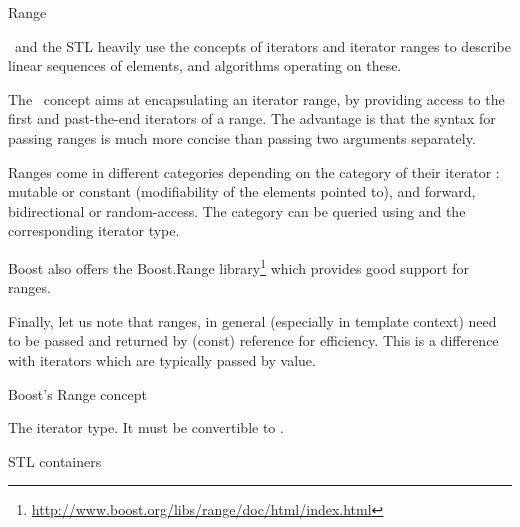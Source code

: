 \begin{ccRefConcept}{Range}

\ccDefinition

\cgal\ and the STL heavily use the concepts of iterators and iterator ranges
to describe linear sequences of elements, and algorithms operating on these.

The \ccRefName\ concept aims at encapsulating an iterator range, by providing
access to the first and past-the-end iterators of a range.  The advantage is
that the syntax for passing ranges is much more concise than passing two
arguments separately.


Ranges come in different categories depending on the category of their iterator :
mutable or constant (modifiability of the elements pointed to), and forward,
bidirectional or random-access.  The category can be queried using
 and the corresponding iterator type.

Boost also offers the Boost.Range
library\footnote{\url{http://www.boost.org/libs/range/doc/html/index.html}}
which provides good support for ranges.

Finally, let us note that ranges, in general (especially in template context)
need to be passed and returned by (const) reference for efficiency.  This is a
difference with iterators which are typically passed by value.

\ccRefines


Boost's Range concept

{}  %

\ccTypes

 {The iterator type.  It must be convertible to .}


\def\ccTagRmTrailingConst{\ccFalse}

\ccGlue
{}

\def\ccTagRmTrailingConst{\ccTrue}

\ccHasModels
STL containers\\

\end{ccRefConcept}
